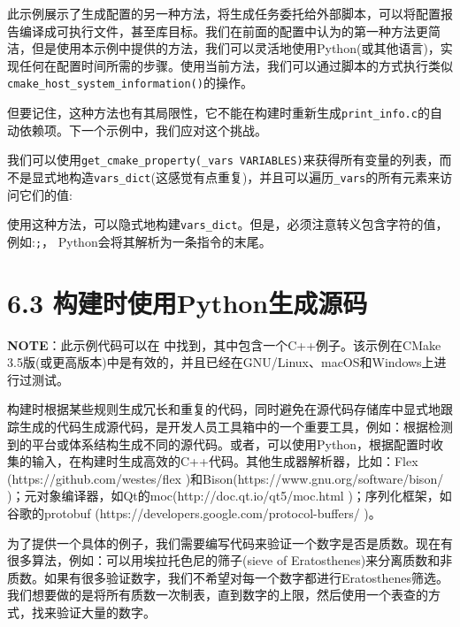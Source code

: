 此示例展示了生成配置的另一种方法，将生成任务委托给外部脚本，可以将配置报告编译成可执行文件，甚至库目标。我们在前面的配置中认为的第一种方法更简洁，但是使用本示例中提供的方法，我们可以灵活地使用Python(或其他语言)，实现任何在配置时间所需的步骤。使用当前方法，我们可以通过脚本的方式执行类似\texttt{cmake\_host\_system\_information()}的操作。

但要记住，这种方法也有其局限性，它不能在构建时重新生成\texttt{print\_info.c}的自动依赖项。下一个示例中，我们应对这个挑战。


我们可以使用\texttt{get\_cmake\_property(\_vars VARIABLES)}来获得所有变量的列表，而不是显式地构造\texttt{vars\_dict}(这感觉有点重复)，并且可以遍历\texttt{\_vars}的所有元素来访问它们的值:


使用这种方法，可以隐式地构建\texttt{vars\_dict}。但是，必须注意转义包含字符的值，例如:\texttt{;}， Python会将其解析为一条指令的末尾。


\section{6.3 构建时使用Python生成源码}

\begin{myInfoBox}
\textbf{NOTE}：此示例代码可以在  中找到，其中包含一个C++例子。该示例在CMake 3.5版(或更高版本)中是有效的，并且已经在GNU/Linux、macOS和Windows上进行过测试。
\end{myInfoBox}

构建时根据某些规则生成冗长和重复的代码，同时避免在源代码存储库中显式地跟踪生成的代码生成源代码，是开发人员工具箱中的一个重要工具，例如：根据检测到的平台或体系结构生成不同的源代码。或者，可以使用Python，根据配置时收集的输入，在构建时生成高效的C++代码。其他生成器解析器，比如：Flex (https://github.com/westes/flex )和Bison(https://www.gnu.org/software/bison/ )；元对象编译器，如Qt的moc(http://doc.qt.io/qt5/moc.html )；序列化框架，如谷歌的protobuf (https://developers.google.com/protocol-buffers/ )。


为了提供一个具体的例子，我们需要编写代码来验证一个数字是否是质数。现在有很多算法，例如：可以用埃拉托色尼的筛子(sieve of Eratosthenes)来分离质数和非质数。如果有很多验证数字，我们不希望对每一个数字都进行Eratosthenes筛选。我们想要做的是将所有质数一次制表，直到数字的上限，然后使用一个表查的方式，找来验证大量的数字。

